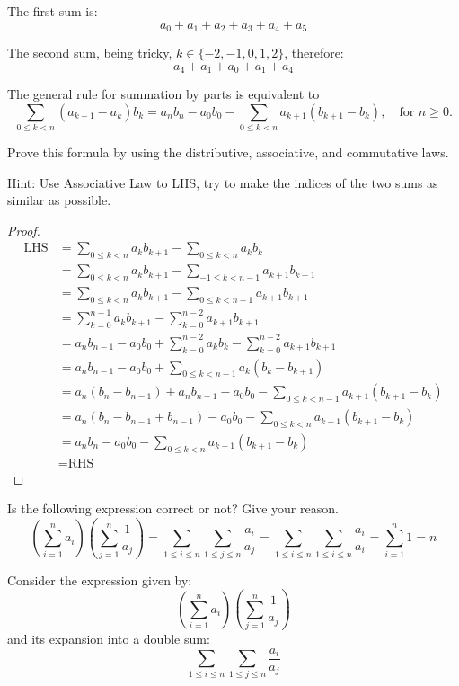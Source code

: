 \documentclass[
	12pt, %
	fleqn, %
	a4paper, %
]{LegrandOrangeBook}
\begin{document}
The first sum is:
\[
a_0 + a_1 + a_2 + a_3 + a_4 + a_5
\]

The second sum, being tricky, $k \in \{-2, -1, 0, 1, 2\}$, therefore:
\[
a_4 + a_1 + a_0 + a_1 + a_4
\]

\begin{exercise}
    The general rule for summation by parts is equivalent to
\[
\sum_{0 \leq k < n} (a_{k+1} - a_k)b_k = a_nb_n - a_0b_0 - \sum_{0 \leq k < n} a_{k+1}(b_{k+1} - b_k), \quad \text{for } n \geq 0.
\]

Prove this formula by using the distributive, associative, and commutative laws.
\end{exercise}
Hint: Use Associative Law to LHS, try to make the indices of the two sums as similar as possible.
\begin{proof}
    \begin{align*}
        \text{LHS} &= \sum_{0\leq k < n} a_k b_{k+1} - \sum_{0\leq k < n} a_k b_k \\
        &= \sum_{0\leq k < n} a_k b_{k+1} - \sum_{-1\leq k < n-1} a_{k+1} b_{k+1} \\
        &= \sum_{0\leq k < n} a_k b_{k+1} - \sum_{0\leq k < n-1} a_{k+1} b_{k+1} \\
        &= \sum_{k=0}^{n-1} a_k b_{k+1} - \sum_{k=0}^{n-2} a_{k+1} b_{k+1} \\
        &= a_n b_{n-1} - a_0 b_0 + \sum_{k=0}^{n-2} a_k b_k - \sum_{k=0}^{n-2} a_{k+1} b_{k+1} \\
        &= a_n b_{n-1} - a_0 b_0 + \sum_{0\leq k < n-1} a_k (b_k - b_{k+1}) \\
        &= a_n (b_n - b_{n-1}) + a_n b_{n-1} - a_0 b_0 - \sum_{0\leq k < n-1} a_{k+1} (b_{k+1} - b_k) \\
        &= a_n (b_n - b_{n-1} + b_{n-1}) - a_0 b_0 - \sum_{0\leq k < n} a_{k+1} (b_{k+1} - b_k) \\
        &= a_n b_n - a_0 b_0 - \sum_{0\leq k < n} a_{k+1} (b_{k+1} - b_k) \\
        &= \text{RHS}
        \end{align*}
\end{proof}
\begin{exercise}
    Is the following expression correct or not? Give your reason.
    \[
\left( \sum_{i=1}^{n} a_i \right) \left( \sum_{j=1}^{n} \frac{1}{a_j} \right) = \sum_{1 \leq i \leq n} \sum_{1 \leq j \leq n} \frac{a_i}{a_j} = \sum_{1 \leq i \leq n} \sum_{1 \leq i \leq n} \frac{a_i}{a_i} = \sum_{i=1}^{n} 1 = n
\]
\end{exercise}
Consider the expression given by:
\[
\left( \sum_{i=1}^{n} a_i \right) \left( \sum_{j=1}^{n} \frac{1}{a_j} \right)
\]
and its expansion into a double sum:
\[
\sum_{1 \leq i \leq n} \sum_{1 \leq j \leq n} \frac{a_i}{a_j}
\]
\end{document}

